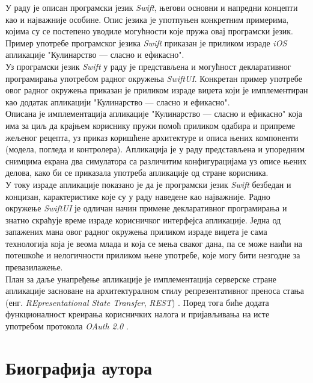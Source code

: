 \documentclass[12pt,oneside]{memoir}
\begin{document}
\indent У раду је описан програмски језик \textit{Swift}, његови основни и напредни концепти као и најважније особине. Опис језика је употпуњен конкретним примерима, којима су се постепено уводиле могућности које пружа овај програмски језик. Пример употребе програмског језика \textit{Swift} приказан је приликом израде \textit{iOS} апликације "Кулинарство --- сласно и ефикасно". 
\\
\indent Уз програмски језик \textit{Swift} у раду је представљена и могућност декларативног програмирања употребом радног окружења \textit{SwiftUI}. Конкретан пример употребе овог радног окружења приказан је приликом израде виџета који је имплементиран као додатак апликацији "Кулинарство --- сласно и ефикасно".
\\
\indent Описана је имплементација апликације "Кулинарство --- сласно и ефикасно" која има за циљ да крајњем кориснику пружи помоћ приликом одабира и припреме жељеног рецепта, уз приказ коришћене архитектуре и описа њених компоненти (модела, погледа и контролера). Апликација је у раду представљена и упоредним снимцима екрана два симулатора са различитим конфигурацијама уз описе њених делова, како би се приказала употреба апликације од стране корисника.
\\
\indent У току израде апликације показано је да је програмски језик \textit{Swift} безбедан и концизан, карактеристике које су у раду наведене као најважније. Радно окружење \textit{SwiftUI} је одличан начин примене декларативног програмирања и знатно скраћује време израде корисничког интерфејса апликације. Једна од запажених мана овог радног окружења приликом израде виџета је сама технологија која је веома млада и која се мења сваког дана, па се може наићи на потешкоће и нелогичности приликом њене употребе, које могу бити незгодне за превазилажење.
\\
\indent План за даље унапређење апликације је имплементација серверске стране апликације засноване на архитектуралном стилу репрезентативног преноса стања (енг. \textit{REpresentational State Transfer}, \textit{REST}) \cite{REST}. Поред тога биће додата функционалност креирања корисничких налога и пријављивања на исте употребом протокола \textit{OAuth 2.0} \cite{OAuth}.

\literatura

\chapter*{Биографија аутора}
\end{document}
